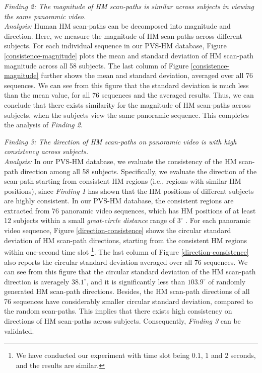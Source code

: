 \documentclass[10pt,journal,compsoc]{IEEEtran}
\begin{document}
\emph{Finding 2: The magnitude of HM scan-paths is similar across subjects in viewing the same panoramic video.}
\\ \textit{Analysis:} Human HM scan-paths can be decomposed into magnitude and direction.
 Here, we measure the magnitude of HM scan-paths across different subjects.
For each individual sequence in our PVS-HM database, Figure \ref{consistence-magnitude} plots the mean and standard deviation of HM scan-path magnitude across all 58 subjects.
The last column of Figure \ref{consistence-magnitude} further shows the mean and standard deviation, averaged over all 76 sequences.
We can see from this figure that the standard deviation is much less than the mean value, for all 76 sequences and the averaged results.
Thus, we can conclude that there exists similarity for the magnitude of HM scan-paths across subjects, when the subjects view the same panoramic sequence.
This completes the analysis of \textit{Finding 2}.



\emph{Finding 3: The direction of HM scan-paths on panoramic video is with high consistency across subjects.}
\\ \textit{Analysis:} In  our PVS-HM database, we evaluate the consistency of the HM scan-path direction among all 58 subjects.
Specifically, we evaluate the direction of the scan-path starting from consistent HM regions (i.e., regions with similar HM positions), since \textit{Finding 1} has shown that the HM positions of different subjects are highly consistent. In our PVS-HM database, the consistent regions are extracted from 76 panoramic video sequences, which has HM positions of at least 12 subjects within a small \textit{great-circle distance} range of $3^{\circ}$ \cite{matin1974saccadic}. For each panoramic video sequence, Figure \ref{direction-consistence} shows the circular standard deviation \cite{frederic2010mean} of HM scan-path directions, starting from the consistent HM regions within one-second time slot \footnote{We have conducted our experiment with time slot being $0.1$, $1$ and $2$ seconds, and the results are similar.}. The last column of Figure \ref{direction-consistence} also reports the circular standard deviation averaged over all 76 sequences.
We can see from this figure that the circular standard deviation of the HM scan-path direction is averagely $38.1^{\circ}$, and it is significantly less than $103.9^{\circ}$ of randomly generated HM scan-path directions. Besides, the HM scan-path directions of all 76 sequences have considerably smaller circular standard deviation, compared to the random scan-paths.
This implies that there exists high consistency on directions of HM scan-paths across subjects.
Consequently, \textit{Finding 3} can be validated.
\end{document}

